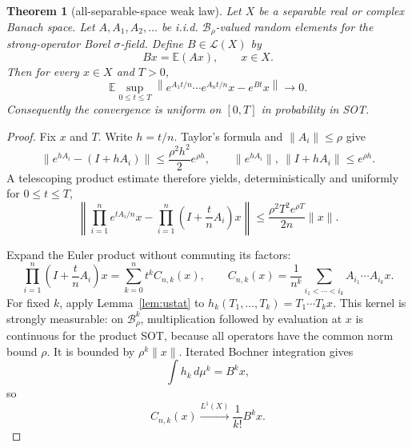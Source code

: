 \documentclass[11pt]{article}
\newtheorem{theorem}{Theorem}
\newcommand{\E}{\mathbb E}
\newcommand{\Lcal}{\mathcal L}
\begin{document}
\begin{theorem}[all-separable-space weak law]\label{thm:main}
Let $X$ be a separable real or complex Banach space.  Let
$A,A_1,A_2,\ldots$ be i.i.d. $\mathcal B_\rho$-valued random elements for
the strong-operator Borel $\sigma$-field.  Define $B\in\Lcal(X)$ by
\[
 Bx=\E(Ax),\qquad x\in X.
\]
Then for every $x\in X$ and $T>0$,
\begin{equation}\label{eq:L1}
 \E\sup_{0\leq t\leq T}
 \left\|e^{A_1t/n}\cdots e^{A_nt/n}x-e^{Bt}x\right\|
 \longrightarrow0.
\end{equation}
Consequently the convergence is uniform on $[0,T]$ in probability in SOT.
\end{theorem}

\begin{proof}
Fix $x$ and $T$.  Write $h=t/n$.  Taylor's formula and
$\|A_i\|\leq\rho$ give
\[
 \|e^{hA_i}-(I+hA_i)\|
 \leq \frac{\rho^2h^2}{2}e^{\rho h},
 \qquad
 \|e^{hA_i}\|,\ \|I+hA_i\|\leq e^{\rho h}.
\]
A telescoping product estimate therefore yields, deterministically and
uniformly for $0\leq t\leq T$,
\begin{equation}\label{eq:euler-error}
 \left\|\prod_{i=1}^ne^{tA_i/n}x-
 \prod_{i=1}^n\left(I+\frac tnA_i\right)x\right\|
 \leq \frac{\rho^2T^2e^{\rho T}}{2n}\|x\|.
\end{equation}

Expand the Euler product without commuting its factors:
\begin{equation}\label{eq:expand}
 \prod_{i=1}^n\left(I+\frac tnA_i\right)x
 =\sum_{k=0}^n t^k C_{n,k}(x),\qquad
 C_{n,k}(x)=\frac1{n^k}\sum_{i_1<\cdots<i_k}
 A_{i_1}\cdots A_{i_k}x.
\end{equation}
For fixed $k$, apply Lemma~\ref{lem:ustat} to
$h_k(T_1,\ldots,T_k)=T_1\cdots T_kx$.  This kernel is strongly measurable:
on $\mathcal B_\rho^k$, multiplication followed by evaluation at $x$ is
continuous for the product SOT, because all operators have the common norm
bound $\rho$.  It is bounded by $\rho^k\|x\|$.  Iterated Bochner integration
gives
\[
 \int h_k\,d\mu^k=B^kx,
\]
so
\begin{equation}\label{eq:coeff}
 C_{n,k}(x)\xrightarrow{L^1(X)}\frac1{k!}B^kx.
\end{equation}


\end{proof}
\end{document}
